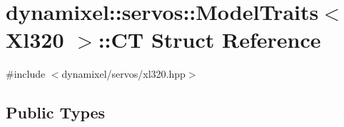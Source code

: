 \hypertarget{structdynamixel_1_1servos_1_1_model_traits_3_01_xl320_01_4_1_1_c_t}{}\section{dynamixel\+:\+:servos\+:\+:Model\+Traits$<$ Xl320 $>$\+:\+:C\+T Struct Reference}
\label{structdynamixel_1_1servos_1_1_model_traits_3_01_xl320_01_4_1_1_c_t}


{\ttfamily \#include $<$dynamixel/servos/xl320.\+hpp$>$}

\subsection*{Public Types}
